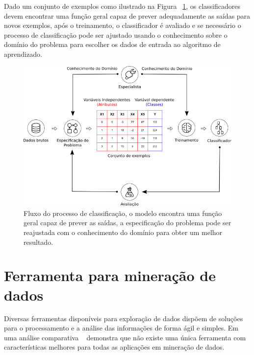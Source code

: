 Dado um conjunto de exemplos como ilustrado na Figura ~\ref{fig:processo_classificacao}, os classificadores devem encontrar uma função geral capaz de prever adequadamente as saídas para novos exemplos, após o treinamento, o classificador é avaliado e se necessário o processo de classificação pode ser ajustado usando o conhecimento sobre o domínio do problema para escolher os dados de entrada ao algoritmo de aprendizado. 


\begin{figure}[H]
\begin{center}
    \includegraphics[scale=0.75]{figuras/processo_classificacao.png}
\end{center}
\caption{Fluxo do processo de classificação, o modelo encontra uma função geral capaz de prever as saídas, a especificação do problema pode ser reajustada com o conhecimento do domínio para obter um melhor resultado.}
\label{fig:processo_classificacao}
\end{figure}


\section{Ferramenta para mineração de dados}

Diversas ferramentas disponíveis para exploração de dados dispõem de soluções para o processamento e a análise das informações de forma ágil e simples. Em uma análise comparativa ~\cite{boscarioli2014avaliaccao} demonstra que não existe uma única ferramenta com características melhores para todas as aplicações em mineração de dados.

